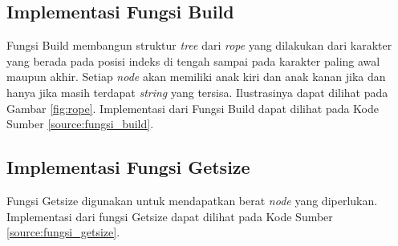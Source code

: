 

\subsection{Implementasi Fungsi Build}
Fungsi Build membangun struktur \textit{tree} dari \textit{rope} yang dilakukan dari karakter yang berada pada posisi indeks di tengah sampai pada karakter paling awal maupun akhir.  Setiap \textit{node} akan memiliki anak kiri dan anak kanan jika dan hanya jika masih terdapat \textit{string} yang tersisa. Ilustrasinya dapat dilihat pada Gambar \ref{fig:rope}. Implementasi dari Fungsi Build dapat dilihat pada Kode Sumber \ref{source:fungsi_build}.



\subsection{Implementasi Fungsi Getsize}
Fungsi Getsize digunakan untuk mendapatkan berat \textit{node} yang diperlukan. Implementasi dari fungsi Getsize dapat dilihat pada Kode Sumber \ref{source:fungsi_getsize}.



